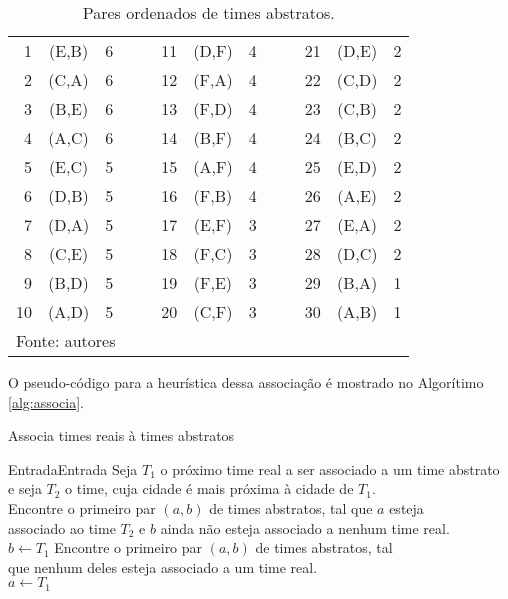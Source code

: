 \documentclass[12pt,a4paper]{article}
\makeatletter
\renewcommand*{\arraystretch}{1.2}
\newcommand{\algorithmfootnote}[2][\footnotesize]{%
	\let\old@algocf@finish\@algocf@finish%
	\def\@algocf@finish{\old@algocf@finish%
		\leavevmode\rlap{\begin{minipage}{\linewidth}
				#1#2
		\end{minipage}}%
	}%
}
\numberwithin{figure}{section}
\numberwithin{table}{section}
\makeatother
\begin{document}
\begin{table}[H]
	\renewcommand{\arraystretch}{1}
	\centering
	\caption{Pares ordenados de times abstratos.}
	\label{tab:abstratos}
	\begin{tabular}{rcc c|c rcc c|c rcc}
		\toprule
		 1 & (E,B) & 6 &&& 11 & (D,F) & 4 &&& 21 & (D,E) & 2 \\
		 2 & (C,A) & 6 &&& 12 & (F,A) & 4 &&& 22 & (C,D) & 2 \\
		 3 & (B,E) & 6 &&& 13 & (F,D) & 4 &&& 23 & (C,B) & 2 \\
		 4 & (A,C) & 6 &&& 14 & (B,F) & 4 &&& 24 & (B,C) & 2 \\
		 5 & (E,C) & 5 &&& 15 & (A,F) & 4 &&& 25 & (E,D) & 2 \\
		 6 & (D,B) & 5 &&& 16 & (F,B) & 4 &&& 26 & (A,E) & 2 \\
		 7 & (D,A) & 5 &&& 17 & (E,F) & 3 &&& 27 & (E,A) & 2 \\
		 8 & (C,E) & 5 &&& 18 & (F,C) & 3 &&& 28 & (D,C) & 2 \\
		 9 & (B,D) & 5 &&& 19 & (F,E) & 3 &&& 29 & (B,A) & 1 \\
		10 & (A,D) & 5 &&& 20 & (C,F) & 3 &&& 30 & (A,B) & 1 \\
		\bottomrule
		\multicolumn{13}{l}{\footnotesize Fonte: autores}
	\end{tabular}
\end{table}

O pseudo-código para a heurística dessa associação é mostrado no Algorítimo \ref{alg:associa}.

\vspace{0.5cm}
\begin{algorithm}[H]
	\caption{Associa times reais à times abstratos}
	\algorithmfootnote{Fonte: \citet*{marcio:jogos}}
	\label{alg:associa}
	Entrada{Entrada}
	 {
		Seja $T_{1}$ o próximo time real a ser associado a um time abstrato\\
		e seja $T_{2}$ o time, cuja cidade é mais próxima à cidade de $T_{1}$.\\
		 {
			Encontre o primeiro par $(a,b)$ de times abstratos, tal que $a$ esteja\\
			associado ao time $T_{2}$ e $b$ ainda não esteja associado a nenhum time real.\\
			$b \leftarrow T_{1}$ }
		{ Encontre o primeiro par $(a,b)$ de times abstratos, tal\\
			que nenhum deles esteja associado a um time real.\\
			$a \leftarrow T_{1}$ } }
\end{algorithm}
\vspace{0.5cm}
\end{document}

